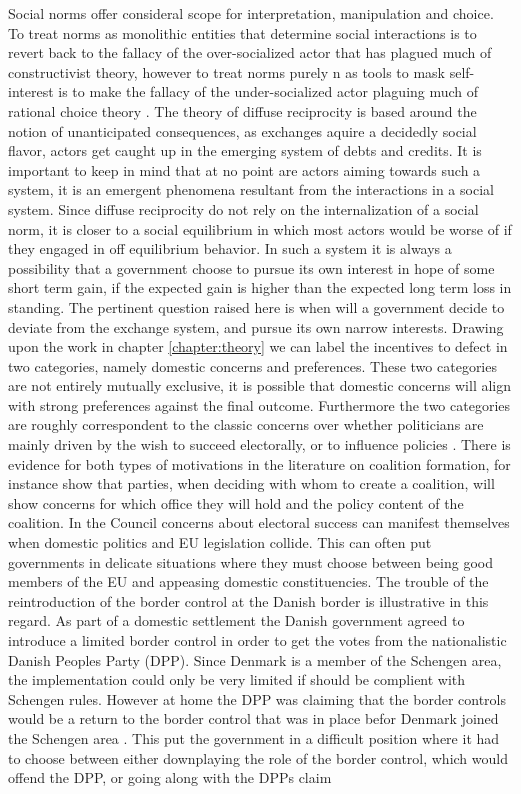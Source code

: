 Social norms offer consideral scope for interpretation, manipulation and choice. To treat norms as monolithic entities that determine social interactions is to revert back to the fallacy of the over-socialized actor that has plagued much of constructivist theory, however to treat norms purely n as tools to mask self-interest is to make the fallacy of the under-socialized actor plaguing much of rational choice theory \citetext{see \citealt{Elster1989} and \citealt{Schimmelfennig2000} for good overviews and critiques}. The theory of diffuse reciprocity is based around the notion of unanticipated consequences, as exchanges aquire a decidedly social flavor, actors get caught up in the emerging system of debts and credits. It is important to keep in mind that at no point are actors aiming towards such a system, it is an emergent phenomena resultant from the interactions in a social system. Since diffuse reciprocity do not rely on the internalization of a social norm, it is closer to a social equilibrium in which most actors would be worse of if they engaged in off equilibrium behavior. In such a system it is always a possibility that a government choose to pursue its own interest in hope of some short term gain, if the expected gain is higher than the expected long term loss in standing. The pertinent question raised here is when will a government decide to deviate from the exchange system, and pursue its own narrow interests. Drawing upon the work in chapter \ref{chapter:theory} we can label the incentives to defect in two categories, namely domestic concerns and preferences. These two categories are not entirely mutually exclusive, it is possible that domestic concerns will align with strong preferences against the final outcome. Furthermore the two categories are roughly correspondent to the classic concerns over whether politicians are mainly driven by the wish to succeed electorally, or to influence policies \citep{Strom1990}. There is evidence for both types of motivations in the literature on coalition formation, for instance \citet{MartinStevenson2001} show that parties, when deciding with whom to create a coalition, will show concerns for which office they will hold and the policy content of the coalition. In the Council concerns about electoral success can manifest themselves when domestic politics and EU legislation collide. This can often put governments in delicate situations where they must choose between being good members of the EU and appeasing domestic constituencies. The trouble of the reintroduction of the border control at the Danish border is illustrative in this regard. As part of a domestic settlement the Danish government agreed to introduce a limited border control in order to get the votes from the nationalistic Danish Peoples Party (DPP). Since Denmark is a member of the Schengen area, the implementation could only be very limited if should be complient with Schengen rules. However at home the DPP was claiming that the border controls would be a return to the border control that was in place befor Denmark joined the Schengen area \citep{Olsen2011,Euractiv2011}. This put the government in a difficult position where it had to choose between either downplaying the role of the border control, which would offend the DPP, or going along with the DPPs claim 
